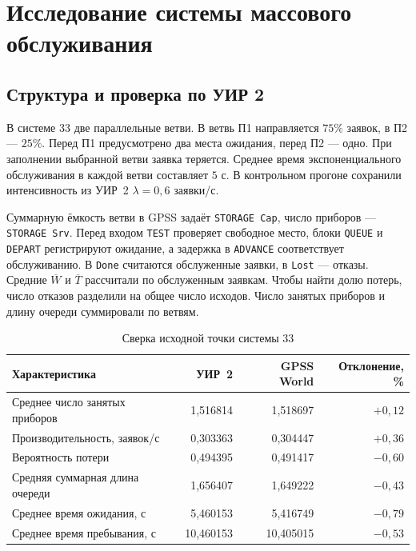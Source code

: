 \section{Исследование системы массового обслуживания}
\label{sec:part1}

\subsection{Структура и проверка по УИР 2}

В системе 33 две параллельные ветви.
В ветвь П1 направляется \(75\%\) заявок, в П2 — \(25\%\).
Перед П1 предусмотрено два места ожидания, перед П2 — одно.
При заполнении выбранной ветви заявка теряется. Среднее время
экспоненциального обслуживания в каждой ветви составляет \(5\) с.
В контрольном прогоне сохранили интенсивность из УИР~2
\(\lambda=0{,}6\) заявки/с.

Суммарную ёмкость ветви в GPSS задаёт \texttt{STORAGE Cap},
число приборов — \texttt{STORAGE Srv}. Перед входом
\texttt{TEST} проверяет свободное место, блоки \texttt{QUEUE}
и \texttt{DEPART} регистрируют ожидание, а задержка в \texttt{ADVANCE}
соответствует обслуживанию. В \texttt{Done} считаются обслуженные
заявки, в \texttt{Lost} — отказы. Средние \(\overline W\) и
\(\overline T\) рассчитали по обслуженным заявкам. Чтобы найти
долю потерь, число отказов разделили на общее число исходов.
Число занятых приборов и длину очереди суммировали по ветвям.

\begin{table}[htbp]
  \centering
  \caption{Сверка исходной точки системы 33}
  \label{tab:p1-baseline}
  \begin{tabular}{@{}lrrr@{}}
  \toprule
  Характеристика & УИР~2 & GPSS World & Отклонение, \% \\
  \midrule
  Среднее число занятых приборов & 1,516814 & 1,518697 & $+0,12$\\
  Производительность, заявок/с & 0,303363 & 0,304447 & $+0,36$\\
  Вероятность потери & 0,494395 & 0,491417 & $-0,60$\\
  Средняя суммарная длина очереди & 1,656407 & 1,649222 & $-0,43$\\
  Среднее время ожидания, с & 5,460153 & 5,416749 & $-0,79$\\
  Среднее время пребывания, с & 10,460153 & 10,405015 & $-0,53$\\
  \bottomrule
  \end{tabular}
\end{table}

